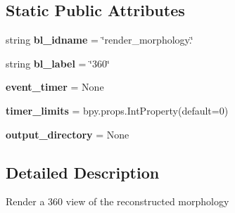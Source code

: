 \subsection*{Static Public Attributes}
\begin{DoxyCompactItemize}
\item 
string {\bfseries bl\+\_\+idname} = \char`\"{}render\+\_\+morphology.\char`\"{}\hypertarget{classmeshy_1_1neuromorphovis_1_1interface_1_1ui_1_1morphology__panel_1_1RenderMorphology360_a60338962cc62d229ad24f724f60c4fd8}{}\label{classmeshy_1_1neuromorphovis_1_1interface_1_1ui_1_1morphology__panel_1_1RenderMorphology360_a60338962cc62d229ad24f724f60c4fd8}

\item 
string {\bfseries bl\+\_\+label} = \char`\"{}360\char`\"{}\hypertarget{classmeshy_1_1neuromorphovis_1_1interface_1_1ui_1_1morphology__panel_1_1RenderMorphology360_a1d1b373c5758569ff6c70229177b3202}{}\label{classmeshy_1_1neuromorphovis_1_1interface_1_1ui_1_1morphology__panel_1_1RenderMorphology360_a1d1b373c5758569ff6c70229177b3202}

\item 
{\bfseries event\+\_\+timer} = None\hypertarget{classmeshy_1_1neuromorphovis_1_1interface_1_1ui_1_1morphology__panel_1_1RenderMorphology360_a944d33b2fe7a6a9889fac082c06b5afb}{}\label{classmeshy_1_1neuromorphovis_1_1interface_1_1ui_1_1morphology__panel_1_1RenderMorphology360_a944d33b2fe7a6a9889fac082c06b5afb}

\item 
{\bfseries timer\+\_\+limits} = bpy.\+props.\+Int\+Property(default=0)\hypertarget{classmeshy_1_1neuromorphovis_1_1interface_1_1ui_1_1morphology__panel_1_1RenderMorphology360_a60b9de7144ec65358a892f99e3cc4399}{}\label{classmeshy_1_1neuromorphovis_1_1interface_1_1ui_1_1morphology__panel_1_1RenderMorphology360_a60b9de7144ec65358a892f99e3cc4399}

\item 
{\bfseries output\+\_\+directory} = None\hypertarget{classmeshy_1_1neuromorphovis_1_1interface_1_1ui_1_1morphology__panel_1_1RenderMorphology360_af6975a135441936119bda4a69c69de08}{}\label{classmeshy_1_1neuromorphovis_1_1interface_1_1ui_1_1morphology__panel_1_1RenderMorphology360_af6975a135441936119bda4a69c69de08}

\end{DoxyCompactItemize}


\subsection{Detailed Description}
\begin{DoxyVerb}Render a 360 view of the reconstructed morphology\end{DoxyVerb}
 

